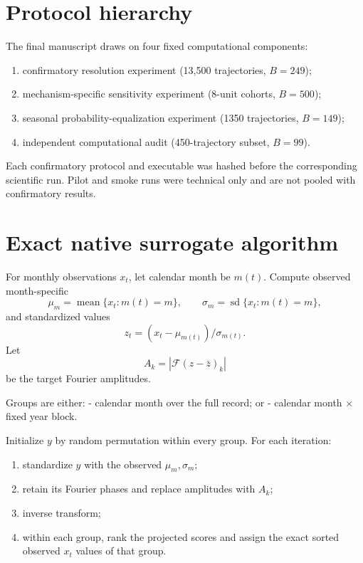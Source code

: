 \section{Protocol hierarchy}\label{protocol-hierarchy}

The final manuscript draws on four fixed computational components:

\begin{enumerate}
\def\labelenumi{\arabic{enumi}.}
\tightlist
\item
  confirmatory resolution experiment (13,500 trajectories, \(B=249\));
\item
  mechanism-specific sensitivity experiment (8-unit cohorts, \(B=500\));
\item
  seasonal probability-equalization experiment (1350 trajectories, \(B=149\));
\item
  independent computational audit (450-trajectory subset, \(B=99\)).
\end{enumerate}

Each confirmatory protocol and executable was hashed before the corresponding scientific run. Pilot and smoke runs were technical only and are not pooled with confirmatory results.

\section{Exact native surrogate algorithm}\label{exact-native-surrogate-algorithm}

For monthly observations \(x_t\), let calendar month be \(m(t)\). Compute observed month-specific \[
\mu_m=\operatorname{mean}\{x_t:m(t)=m\},
\qquad
\sigma_m=\operatorname{sd}\{x_t:m(t)=m\},
\] and standardized values \[
z_t=(x_t-\mu_{m(t)})/\sigma_{m(t)}.
\] Let \[
A_k=|\mathcal F(z-\bar z)_k|
\] be the target Fourier amplitudes.

Groups are either: - calendar month over the full record; or - calendar month \(\times\) fixed year block.

Initialize \(y\) by random permutation within every group. For each iteration:

\begin{enumerate}
\def\labelenumi{\arabic{enumi}.}
\tightlist
\item
  standardize \(y\) with the observed \(\mu_m,\sigma_m\);
\item
  retain its Fourier phases and replace amplitudes with \(A_k\);
\item
  inverse transform;
\item
  within each group, rank the projected scores and assign the exact sorted observed \(x_t\) values of that group.
\end{enumerate}

